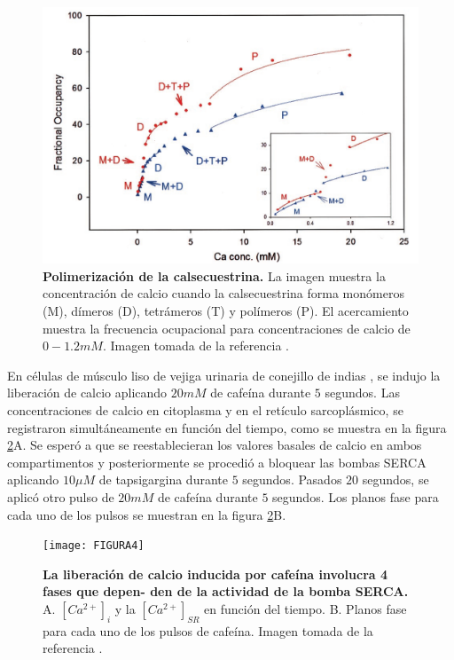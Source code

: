 \documentclass[draft]{article}
\newcommand{\Cai}{[Ca^{2+}]_{i}}
\newcommand{\Cal}{[Ca^{2+}]_{SR}}
\begin{document}
\begin{figure}[h]
	\centering
	\includegraphics{FIGURA11}
	\caption{\textbf{Polimerización de la calsecuestrina.} La imagen muestra la concentración de calcio cuando la calsecuestrina forma monómeros (M), dímeros (D), tetrámeros (T) y polímeros (P). El acercamiento muestra la frecuencia ocupacional para concentraciones de calcio de $0 - 1.2 mM$. Imagen tomada de la referencia \cite{Park2004a}.}
	\label{fig:FIGURA11}
\end{figure}

En células de músculo liso de vejiga urinaria de conejillo de indias \cite{Perez-Rosas2015}, se indujo la liberación de calcio aplicando $20mM$ de cafeína durante $5$ segundos. Las concentraciones de calcio en citoplasma y en el retículo sarcoplásmico, se registraron simultáneamente en función del tiempo, como se muestra en la figura \ref{fig:FIGURA4}A. Se esperó a que se reestablecieran los valores basales de calcio en ambos compartimentos y posteriormente se procedió a bloquear las bombas SERCA aplicando $10\mu M$ de tapsigargina durante $5$ segundos. Pasados $20$ segundos, se aplicó otro pulso de $20mM$ de cafeína durante $5$ segundos. Los planos fase para cada uno de los pulsos se muestran en la figura \ref{fig:FIGURA4}B. \\

\begin{figure}[h]
	\centering
	\texttt{[image: FIGURA4]}
	\caption{\textbf{La liberación de calcio inducida por cafeína involucra 4 fases que depen- den de la actividad de la bomba SERCA.} A. $\Cai$ y la $\Cal$ en función del tiempo. B. Planos fase para cada uno de los pulsos de cafeína. Imagen tomada de la referencia \cite{Perez-Rosas2015}.}
	\label{fig:FIGURA4}
\end{figure}
\end{document}
